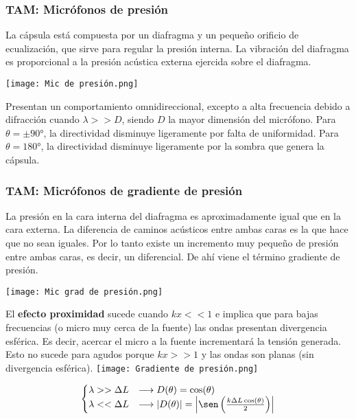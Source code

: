 \documentclass[a4paper, 8pt]{extarticle}
\renewcommand{\sin}{\sen}
\begin{document}
\begin{multicols}{3}
  \subsubsection{TAM: Micrófonos de presión}
  La cápsula está compuesta por un diafragma y un pequeño orificio de ecualización, que sirve para regular la presión interna. La vibración del diafragma es proporcional a la presión acústica externa ejercida sobre el diafragma.
  \begin{center}
    \texttt{[image: Mic de presión.png]}
  \end{center}
  Presentan un comportamiento omnidireccional, excepto a alta frecuencia debido a difracción cuando $\lambda >> D$, siendo $D$ la mayor dimensión del micrófono. Para $\theta = \pm \ang{90}$, la directividad disminuye ligeramente por falta de uniformidad. Para $\theta = \ang{180}$, la directividad disminuye ligeramente por la sombra que genera la cápsula.

  \subsubsection{TAM: Micrófonos de gradiente de presión}

  La presión en la cara interna del diafragma es aproximadamente igual que en la cara externa. La diferencia de caminos acústicos entre ambas caras es la que hace que no sean iguales. Por lo tanto existe un incremento muy pequeño de presión entre ambas caras, es decir, un diferencial. De ahí viene el término gradiente de presión.
  \vspace*{\fill}
  \begin{center}
    \texttt{[image: Mic grad de presión.png]}
  \end{center}

  El \textbf{efecto proximidad} sucede cuando $kx << 1$ e implica que para bajas frecuencias (o micro muy cerca de la fuente) las ondas presentan divergencia esférica. Es decir, acercar el micro a la fuente incrementará la tensión generada. Esto no sucede para agudos porque $kx >> 1$ y las ondas son planas (sin divergencia esférica).
  \texttt{[image: Gradiente de presión.png]}

  \[ \left\lbrace
    \begin{matrix*}[l]
      \lambda >> \Delta L & \longrightarrow D (\theta ) = \cos (\theta )\\
      \lambda << \Delta L & \longrightarrow \abs{D (\theta )} = \abs{\sin \left( \frac{k \Delta L \cos (\theta)}{2} \right)}
    \end{matrix*} \right. \]


\end{multicols}
\end{document}
